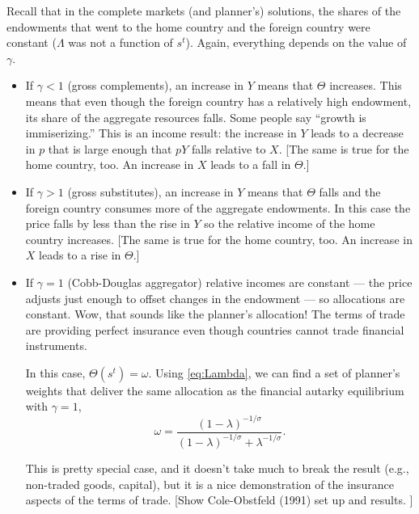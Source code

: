 \documentclass[11pt,pdftex,twoside,letterpaper]{exam}
\begin{document}
Recall that in the complete markets (and planner's) solutions, the shares of the endowments that went to the home country and the foreign country were constant ($\Lambda$ was not a function of $s^t$). Again, everything depends on the value of $\gamma$.
\begin{itemize}

  \item If $\gamma<1$ (gross complements), an increase in $Y$ means that $\Theta$ increases. This means that even though the foreign country has a relatively high endowment, its share of the aggregate resources falls. Some people say ``growth is immiserizing.'' This is an income result: the increase in $Y$ leads to a decrease in $p$ that is large enough that $pY$ falls relative to $X$. [The same is true for the home country, too. An increase in $X$ leads to a fall in $\Theta$.]
  \item If $\gamma>1$ (gross substitutes), an increase in $Y$ means that $\Theta$ falls and the foreign country consumes more of the aggregate endowments. In this case the price falls by less than the rise in $Y$ so the relative income of the home country increases. [The same is true for the home country, too. An increase in $X$ leads to a rise in $\Theta$.]
      \item If $\gamma=1$ (Cobb-Douglas aggregator) relative incomes are constant --- the price adjusts just enough to offset changes in the endowment --- so allocations are constant. Wow, that sounds like the planner's allocation! The terms of trade are providing perfect insurance even though countries cannot trade financial instruments.

          In this case, $\Theta(s^t)=\omega$. Using \eqref{eq:Lambda}, we can find a set of planner's weights that deliver the same allocation as the financial autarky equilibrium with $\gamma=1$,
          \begin{equation}
            \omega = \frac{(1-\lambda)^{-1/\sigma}}{(1-\lambda)^{-1/\sigma}+\lambda^{-1/\sigma}}.
          \end{equation}

    This is pretty special case, and it doesn't take much to break the result (e.g., non-traded goods, capital), but it is a nice demonstration of the insurance aspects of the terms of trade. [Show Cole-Obstfeld (1991) set up and results. ]
\end{itemize}
\end{document}
